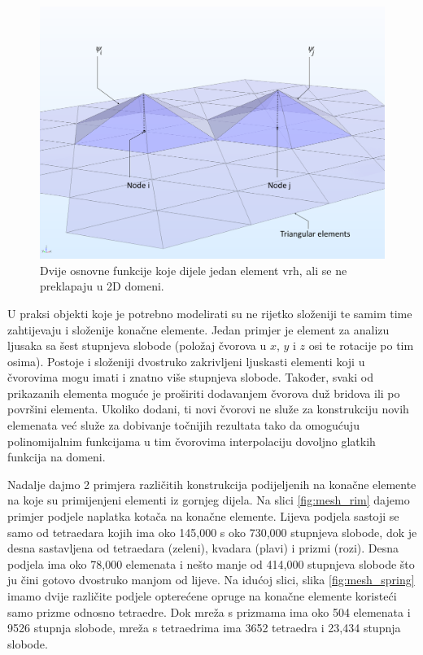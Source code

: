 \documentclass[a4paper,twoside,12pt]{memoir} %
\begin{document}
\begin{figure}[h!t]
\begin{center}
\includegraphics[scale=0.42]{pictures/chapter_fem/base-functions-no-overlap.png}
\caption{Dvije osnovne funkcije koje dijele jedan element vrh, ali se ne preklapaju u 2D domeni. \cite{comsol_fem_general}}
\label{fig:base_triangle_elements}
\end{center}
\end{figure}

\par
U praksi objekti koje je potrebno modelirati su ne rijetko složeniji te samim time zahtijevaju i složenije konačne elemente. Jedan primjer je element za analizu ljusaka sa šest stupnjeva slobode (položaj čvorova u $x$, $y$ i $z$ osi te rotacije po tim osima). Postoje i složeniji dvostruko zakrivljeni ljuskasti elementi koji u čvorovima mogu imati i znatno više stupnjeva slobode. Također, svaki od prikazanih elementa moguće je proširiti dodavanjem čvorova duž bridova ili po površini elementa. Ukoliko dodani, ti novi čvorovi ne služe za konstrukciju novih elemenata već služe za dobivanje točnijih rezultata tako da omogućuju polinomijalnim funkcijama u tim čvorovima interpolaciju dovoljno glatkih funkcija na domeni.\par

Nadalje dajmo 2 primjera različitih konstrukcija podijeljenih na konačne elemente na koje su primijenjeni elementi iz gornjeg dijela. Na slici \ref{fig:mesh_rim} dajemo primjer podjele naplatka kotača na konačne elemente. Lijeva podjela sastoji se samo od tetraedara kojih ima oko 145,000 s oko 730,000 stupnjeva slobode, dok je desna sastavljena od tetraedara (zeleni), kvadara (plavi) i prizmi (rozi). Desna podjela ima oko 78,000 elemenata i nešto manje od 414,000 stupnjeva slobode što ju čini gotovo dvostruko manjom od lijeve. Na idućoj slici, slika \ref{fig:mesh_spring} imamo dvije različite podjele opterećene opruge na konačne elemente koristeći samo prizme odnosno tetraedre. Dok mreža s prizmama ima oko 504 elemenata i 9526 stupnja slobode, mreža s tetraedrima ima 3652 tetraedra i 23,434 stupnja slobode.
\end{document}
